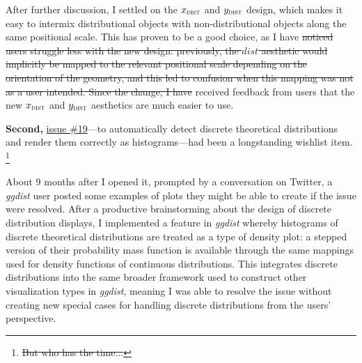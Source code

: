 \documentclass[journal]{vgtc}                     %
\providecommand{\DIFadd}[1]{{\protect\color{blue}\uwave{#1}}} %
\providecommand{\DIFdel}[1]{{\protect\color{red}\sout{#1}}}                      %
\providecommand{\DIFaddbegin}{} %
\providecommand{\DIFaddend}{} %
\providecommand{\DIFdelbegin}{} %
\providecommand{\DIFdelend}{} %
\begin{document}
\DIFdelend %
After further discussion, I settled on the $x_\textsc{dist}$ and $y_\textsc{dist}$ design, which \DIFaddbegin \DIFadd{also }\DIFaddend makes it easy to intermix distributional objects with non-distributional objects along the same positional scale. This has proven to be a good choice, as I have 
\DIFdelbegin \DIFdel{noticed users struggle less with the new design: previously, the $\textit{dist}$ aesthetic would implicitly be mapped to the relevant positional scale depending on the orientation of the geometry, and this led to confusion when this mapping was not as a user intended. Since the change, I have }\DIFdelend %
received feedback from users that the new $x_\textsc{dist}$ and $y_\textsc{dist}$ aesthetics are much easier to use.

\textbf{Second,} \href{https://github.com/mjskay/ggdist/issues/19}{issue \#19}---to automatically detect discrete theoretical distributions and render them correctly as histograms---had been a longstanding wishlist item.
\DIFdelbegin \footnote{\DIFdel{But who has the time...}} %
\addtocounter{footnote}{-1}%
\DIFdelend %
About 9 months after I opened it, prompted by a conversation on Twitter, a \textit{ggdist} user posted some examples of plots they might be able to create if the issue were resolved. After a productive brainstorming about the design of discrete distribution displays, I implemented a feature in \textit{ggdist} whereby histograms of discrete theoretical distributions are treated as a type of density plot: a stepped version of their probability mass function is available through the same mappings used for density functions of continuous distributions. This integrates discrete distributions into the same broader framework used to construct other visualization types in \textit{ggdist}, meaning I was able to resolve the issue without creating new special cases for handling discrete distributions from the users' perspective.
\end{document}
